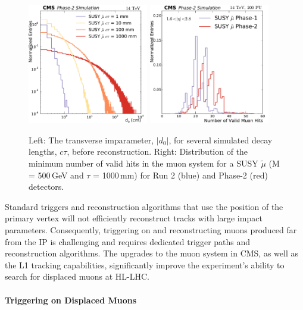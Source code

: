 \begin{figure}[t]\begin{center}
\includegraphics[width=0.47\textwidth]{figures/Stage0h1_0_d0_smuon_daughter}
\includegraphics[width=0.47\textwidth]{figures/MuonHitsEndcap}
\caption{
Left: The transverse imparameter, $|d_{0}|$, for several simulated decay lengths, $c\tau$, before reconstruction.
Right: Distribution of the minimum number of valid hits in the muon system for a SUSY $\widetilde{\mu}$ (M = 500\,GeV and $\tau$ = 1000\,mm) for Run 2 (blue) and Phase-2 (red) detectors. 
}
\label{fig:perfDisplaced}
\end{center}
\end{figure}

Standard triggers and reconstruction algorithms that use the position of the primary vertex will not efficiently reconstruct tracks with large impact parameters.
Consequently, triggering on and reconstructing muons produced far  from the IP is challenging and requires dedicated trigger paths and reconstruction algorithms. 
The upgrades to the muon system in CMS, as well as the L1 tracking capabilities, significantly improve the experiment's ability to search for displaced muons at HL-LHC. 

\paragraph{Triggering on Displaced Muons}

